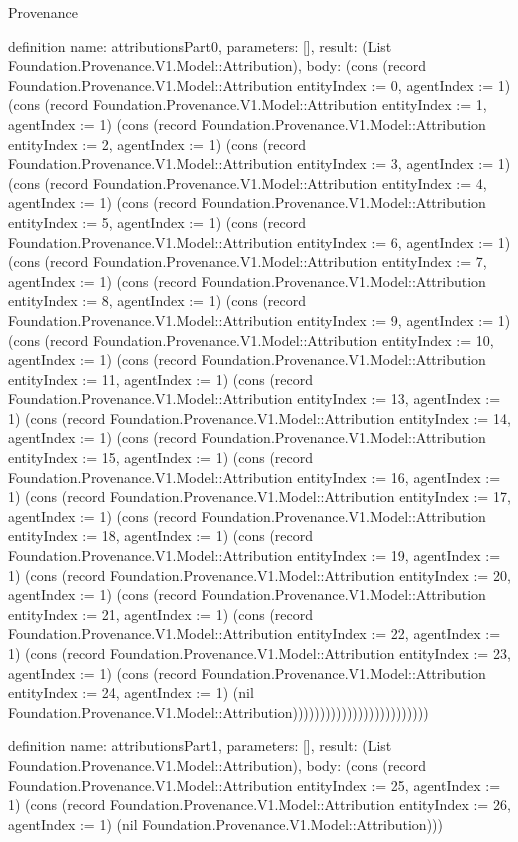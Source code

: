 \begin{lexlean}{Provenance}
\begin{semanticmodule}
definition{
  name: attributionsPart0,
  parameters: [],
  result: (List Foundation.Provenance.V1.Model::Attribution),
  body: (cons (record Foundation.Provenance.V1.Model::Attribution {entityIndex := 0, agentIndex := 1}) (cons (record Foundation.Provenance.V1.Model::Attribution {entityIndex := 1, agentIndex := 1}) (cons (record Foundation.Provenance.V1.Model::Attribution {entityIndex := 2, agentIndex := 1}) (cons (record Foundation.Provenance.V1.Model::Attribution {entityIndex := 3, agentIndex := 1}) (cons (record Foundation.Provenance.V1.Model::Attribution {entityIndex := 4, agentIndex := 1}) (cons (record Foundation.Provenance.V1.Model::Attribution {entityIndex := 5, agentIndex := 1}) (cons (record Foundation.Provenance.V1.Model::Attribution {entityIndex := 6, agentIndex := 1}) (cons (record Foundation.Provenance.V1.Model::Attribution {entityIndex := 7, agentIndex := 1}) (cons (record Foundation.Provenance.V1.Model::Attribution {entityIndex := 8, agentIndex := 1}) (cons (record Foundation.Provenance.V1.Model::Attribution {entityIndex := 9, agentIndex := 1}) (cons (record Foundation.Provenance.V1.Model::Attribution {entityIndex := 10, agentIndex := 1}) (cons (record Foundation.Provenance.V1.Model::Attribution {entityIndex := 11, agentIndex := 1}) (cons (record Foundation.Provenance.V1.Model::Attribution {entityIndex := 13, agentIndex := 1}) (cons (record Foundation.Provenance.V1.Model::Attribution {entityIndex := 14, agentIndex := 1}) (cons (record Foundation.Provenance.V1.Model::Attribution {entityIndex := 15, agentIndex := 1}) (cons (record Foundation.Provenance.V1.Model::Attribution {entityIndex := 16, agentIndex := 1}) (cons (record Foundation.Provenance.V1.Model::Attribution {entityIndex := 17, agentIndex := 1}) (cons (record Foundation.Provenance.V1.Model::Attribution {entityIndex := 18, agentIndex := 1}) (cons (record Foundation.Provenance.V1.Model::Attribution {entityIndex := 19, agentIndex := 1}) (cons (record Foundation.Provenance.V1.Model::Attribution {entityIndex := 20, agentIndex := 1}) (cons (record Foundation.Provenance.V1.Model::Attribution {entityIndex := 21, agentIndex := 1}) (cons (record Foundation.Provenance.V1.Model::Attribution {entityIndex := 22, agentIndex := 1}) (cons (record Foundation.Provenance.V1.Model::Attribution {entityIndex := 23, agentIndex := 1}) (cons (record Foundation.Provenance.V1.Model::Attribution {entityIndex := 24, agentIndex := 1}) (nil Foundation.Provenance.V1.Model::Attribution)))))))))))))))))))))))))
}

definition{
  name: attributionsPart1,
  parameters: [],
  result: (List Foundation.Provenance.V1.Model::Attribution),
  body: (cons (record Foundation.Provenance.V1.Model::Attribution {entityIndex := 25, agentIndex := 1}) (cons (record Foundation.Provenance.V1.Model::Attribution {entityIndex := 26, agentIndex := 1}) (nil Foundation.Provenance.V1.Model::Attribution)))
}


\end{semanticmodule}
\end{lexlean}

